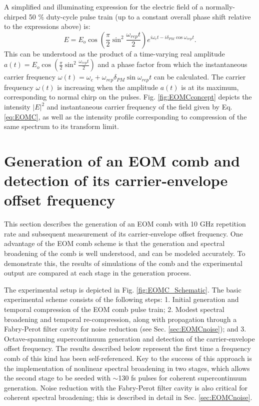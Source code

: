 A simplified and illuminating expression for the electric field of a normally-chirped 50 $\%$ duty-cycle pulse train (up to a constant overall phase shift relative to the expressions above) is:
\begin{equation}
E=E_o\cos\left(\frac{\pi}{2}\sin^2{\frac{\omega_{rep}t}{2}}\right)e^{i\omega_ct-i\delta_{PM}\cos{\omega_{rep}t}}. \label{eq:EOMC}
\end{equation}
This can be understood as the product of a time-varying real amplitude $a(t)=E_o\cos\left(\frac{\pi}{2}\sin^2{\frac{\omega_{rep}t}{2}}\right)$ and a phase factor from which the instantaneous carrier frequency $\omega(t)=\omega_c+\omega_{rep}\delta_{PM}\sin{\omega_{rep}t}$ can be calculated. The carrier frequency $\omega(t)$ is increasing when the amplitude $a(t)$ is at its maximum, corresponding to normal chirp on the pulses. Fig. \ref{fig:EOMCconcept} depicts the intensity $|E|^2$ and instantaneous carrier frequency of the field given by Eq. \ref{eq:EOMC}, as well as the intensity profile corresponding to compression of the same spectrum to its transform limit.




\section{Generation of an EOM comb and detection of its carrier-envelope offset frequency}

This section describes the generation of an EOM comb with 10 GHz repetition rate and subsequent measurement of its carrier-envelope offset frequency. One advantage of the EOM comb scheme is that the generation and spectral broadening of the comb is well understood, and can be modeled accurately. To demonstrate this, the results of simulations of the comb and the experimental output are compared at each stage in the generation process.

The experimental setup is depicted in Fig. \ref{fig:EOMC_Schematic}. The basic experimental scheme consists of the following steps: 1. Initial generation and temporal compression of the EOM comb pulse train; 2. Modest spectral broadening and temporal re-compression, along with propagation through a Fabry-Perot filter cavity for noise reduction (see Sec. \ref{sec:EOMCnoise}); and 3. Octave-spanning supercontinuum generation and detection of the carrier-envelope offset frequency. The results described below represent the first time a frequency comb of this kind has been self-referenced. Key to the success of this approach is the implementation of nonlinear spectral broadening in two stages, which allows the second stage to be seeded with $\sim$130 fs pulses for coherent supercontinuum generation. Noise reduction with the Fabry-Perot filter cavity is also critical for coherent spectral broadening; this is described in detail in Sec. \ref{sec:EOMCnoise}.

